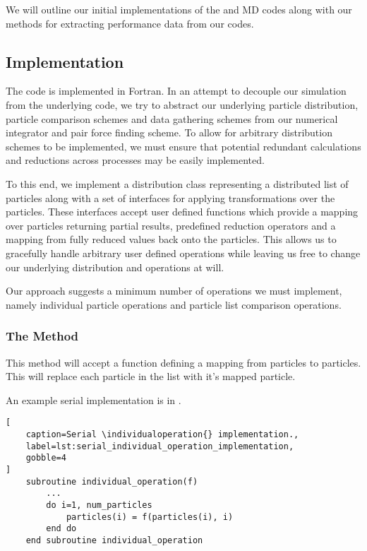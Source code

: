 We will outline our initial implementations of
the \replicateddata{} and \systolicloop{} MD codes
along with our methods for extracting performance data from our codes.

\subsection{Implementation}
\label{sec:methodology:subsec:implementation}

The code is implemented in Fortran.
%
In an attempt to decouple our simulation from the underlying code,
we try to abstract our underlying
particle distribution,
particle comparison schemes and
data gathering schemes
from our numerical integrator and pair force finding scheme.
%
To allow for arbitrary distribution schemes to be implemented,
we must ensure that potential redundant calculations and reductions
across processes may be easily implemented.

To this end, we implement a distribution class
representing a distributed list of particles
along with a set of interfaces for applying transformations over the particles.
%
These interfaces accept user defined functions which provide
a mapping over particles returning partial results,
predefined reduction operators and
a mapping from fully reduced values back onto the particles.
%
This allows us to gracefully handle arbitrary user defined operations while
leaving us free to change our underlying distribution and operations
at will.

%
Our approach suggests a minimum number of operations we must implement,
namely individual particle operations and particle list comparison
operations.


\subsubsection{The \individualoperation{} Method}
\label{sec:the_individual_operation_method}

This method will accept a function defining a mapping from
particles to particles.
This will replace each particle in the list with it's mapped
particle.

An example serial implementation is in
.

\begin{lstlisting}[
    caption=Serial \individualoperation{} implementation.,
    label=lst:serial_individual_operation_implementation,
    gobble=4
]
    subroutine individual_operation(f)
        ...
        do i=1, num_particles
            particles(i) = f(particles(i), i)
        end do
    end subroutine individual_operation
\end{lstlisting}

